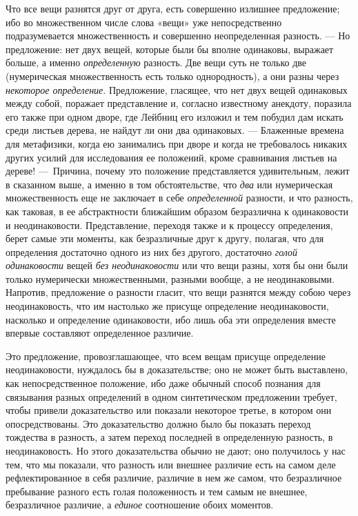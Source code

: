 Что все вещи разнятся друг от друга, есть совершенно излишнее предложение;
ибо во множественном числе слова «вещи» уже непосредственно подразумевается
множественность и совершенно неопределенная разность. — Но предложение: нет
двух вещей, которые были бы вполне одинаковы, выражает больше, а именно
{\em определенную} разность. Две вещи суть не только
две (нумерическая множественность есть только однородность), а они разны
через {\em некоторое определение}. Предложение,
гласящее, что нет двух вещей одинаковых между собой, поражает представление
и, согласно известному анекдоту, поразила его также при одном дворе, где
Лейбниц его изложил и тем побудил дам искать среди листьев дерева, не
найдут ли они два одинаковых. — Блаженные времена для метафизики, когда ею
занимались при дворе и когда не требовалось никаких других усилий для
исследования ее положений, кроме сравнивания листьев на дереве! —~Причина,
почему это положение представляется удивительным, лежит в сказанном выше, а
именно в том обстоятельстве, что {\em два} или
нумерическая множественность еще не заключает в себе
{\em определенной} разности, и что разность, как
таковая, в ее абстрактности ближайшим образом безразлична к одинаковости и
неодинаковости. Представление, переходя также и к процессу определения,
берет самые эти моменты, как безразличные друг к другу, полагая, что для
определения достаточно одного из них без другого, достаточно
{\em голой одинаковости} вещей
{\em без неодинаковости} или что вещи разны, хотя бы
они были только нумерически множественными, разными вообще, а не
неодинаковыми. Напротив, предложение о разности гласит, что вещи разнятся
между собою через неодинаковость, что им настолько же присуще определение
неодинаковости, насколько и определение одинаковости, ибо лишь оба эти
определения вместе впервые составляют определенное различие.

Это предложение, провозглашающее, что всем вещам присуще определение
неодинаковости, нуждалось бы в доказательстве; оно не может быть
выставлено, как непосредственное положение, ибо даже обычный способ
познания для связывания разных определений в одном синтетическом
предложении требует, чтобы привели доказательство или показали некоторое
третье, в котором они опосредствованы. Это доказательство должно было бы
показать переход тождества в разность, а затем переход последней в
определенную разность, в неодинаковость. Но этого доказательства обычно не
дают; оно получилось у нас тем, что мы показали, что разность или внешнее
различие есть на самом деле рефлектированное в себя различие, различие в
нем же самом, что безразличное пребывание разного есть голая положенность и
тем самым не внешнее, безразличное различие, а
{\em единое} соотношение обоих моментов.

